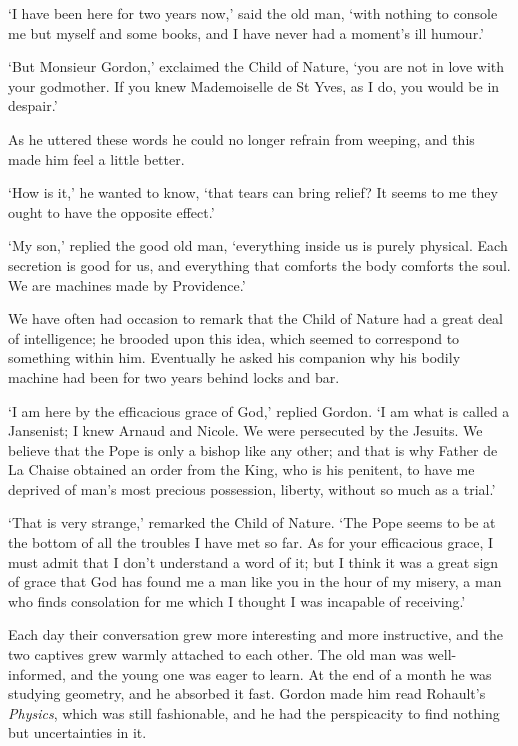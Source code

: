 \documentclass{article}
\begin{document}
\begin{center}
`I have been here for two years now,' said the old man, `with nothing to console 
me but myself and some books, and I have never had a moment's ill humour.' 

`But Monsieur Gordon,' exclaimed the Child of Nature, `you are not in love with 
your godmother. If you knew Mademoiselle de St Yves, as I do, you would be in despair.' 

As he uttered these words he could no longer refrain from weeping, and this made 
him feel a little better. 

`How is it,' he wanted to know, `that tears can bring relief? It seems to me they 
ought to have the opposite effect.' 

`My son,' replied the good old man, `everything inside us is purely physical. Each 
secretion is good for us, and everything that comforts the body comforts the soul. 
We are machines made by Providence.' 

We have often had occasion to remark that the Child of Nature had a great deal 
of intelligence; he brooded upon this idea, which seemed to correspond to something 
within him. Eventually he asked his companion why his bodily machine had been for 
two years behind locks and bar. 

`I am here by the efficacious grace of God,' replied Gordon. `I am what is called 
a Jansenist; I knew Arnaud and Nicole. We were persecuted by the Jesuits. We believe 
that the Pope is only a bishop like any other; and that is why Father de La Chaise 
obtained an order from the King, who is his penitent, to have me deprived of man's 
most precious possession, liberty, without so much as a trial.' 

`That is very strange,' remarked the Child of Nature. `The Pope seems to be at 
the bottom of all the troubles I have met so far. As for your efficacious grace, 
I must admit that I don't understand a word of it; but I think it was a great sign 
of grace that God has found me a man like you in the hour of my misery, a man who 
finds consolation for me which I thought I was incapable of receiving.' 

Each day their conversation grew more interesting and more instructive, and the 
two captives grew warmly attached to each other. The old man was well-informed, 
and the young one was eager to learn. At the end of a month he was studying geometry, 
and he absorbed it fast. Gordon made him read Rohault's \textit{Physics}, which 
was still fashionable, and he had the perspicacity to find nothing but uncertainties 
in it. 


\end{center}
\end{document}
